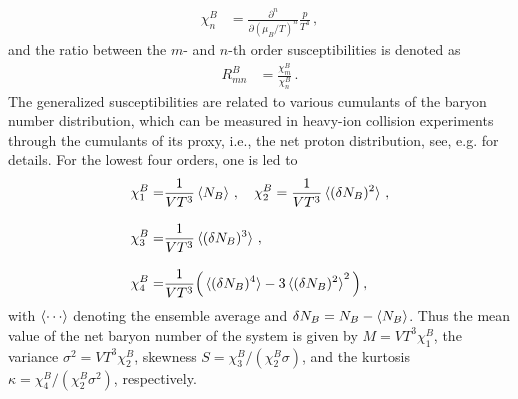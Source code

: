 \documentclass[%
reprint,
superscriptaddress,
showpacs,preprintnumbers,
amsmath,amssymb,
aps,
prd,
]{revtex4-1}
\begin{document}
	\begin{align}
		\chi_n^{B}&=\frac{\partial^n}{\partial (\mu_B/T)^n}\frac{p}{T^4}\,,\label{eq:suscept}
	\end{align}
	and the ratio between the $m$- and $n$-th order susceptibilities is denoted as 
	\begin{align}
		R_{mn}^{B}&=\frac{\chi_m^{B}}{\chi_n^{B}}\,.\label{eq:Rmn}
	\end{align}
	The generalized susceptibilities are related to various cumulants of the baryon number distribution, which can be measured in heavy-ion collision experiments through the cumulants of its proxy, i.e., the net proton distribution, see, e.g. \cite{Luo:2017faz} for details. For the lowest four orders, one is led to
	\begin{align}
		\chi^B_1=&\frac{1}{VT^3}\braket{N_B}\,,\quad \chi^B_2=\frac{1}{VT^3}\braket{(\delta N_B)^2}\,,\label{eq:chiB1}\\[2ex]
		\chi^B_3=&\frac{1}{VT^3}\braket{(\delta N_B)^3}\,,\\[2ex]
		\chi^B_4=&\frac{1}{VT^3}\Big(\braket{(\delta N_B)^4}-3\braket{(\delta N_B)^2}^2\Big)\,,\label{eq:chiB4}
	\end{align}
	with $\braket{\cdots}$ denoting the ensemble average and $\delta N_B=N_B-\braket{N_B}$. Thus the mean value of the net baryon number of the system is given by $M=VT^3\chi_1^{B}$, the variance $\sigma^2=VT^3\chi_2^{B}$, skewness $S=\chi_3^{B}/(\chi_2^{B}\sigma)$, and the kurtosis $\kappa=\chi_4^{B}/(\chi_2^{B}\sigma^2)$, respectively.
	
\end{document}
